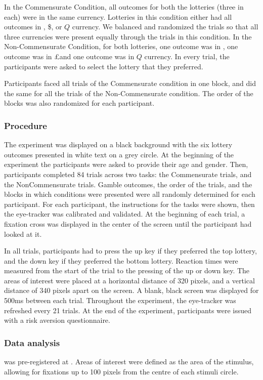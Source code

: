 \documentclass[doc, a4paper, apacite]{apa6}
\def\yenrule{\rule{1.3ex}{.1ex}}
\def\textyen{\renewcommand\stacktype{L}\stackon[.4ex]{\stackon[.65ex]{Y}{\yenrule}}{\yenrule}}
\begin{document}
In the Commensurate Condition, all outcomes for both the lotteries (three in each) were in the same currency. Lotteries in this condition either had all outcomes in \textyen, \$, or $Q$ currency. We balanced and randomized the trials so that all three currencies were present equally through the trials in this condition. In the Non-Commensurate Condition, for both lotteries, one outcome was in \textyen, one outcome was in \pounds\space and one outcome was in $Q$ currency. In every trial, the participants were asked to select the lottery that they preferred. 

Participants faced all trials of the Commensurate condition in one block, and did the same for all the trials of the Non-Commensurate condition. The order of the blocks was also randomized for each participant.

\subsubsection{Procedure}
The experiment was displayed on a black background with the six lottery outcomes presented in white text on a grey circle. At the beginning of the experiment the participants were asked to provide their age and gender. Then, participants completed 84 trials across two tasks: the Commensurate trials, and the NonCommensurate trials. Gamble outcomes, the order of the trials, and the blocks in which conditions were presented were all randomly determined for each participant. For each participant, the instructions for the tasks were shown, then the eye-tracker was calibrated and validated. At the beginning of each trial, a fixation cross was displayed in the center of the screen until the participant had looked at it. 

In all trials, participants had to press the up key if they preferred the top lottery, and the down key if they preferred the bottom lottery. Reaction times were measured from the start of the trial to the pressing of the up or down key. The areas of interest were placed at a horizontal distance of 320 pixels, and a vertical distance of 340 pixels apart on the screen. A blank, black screen was displayed for 500ms between each trial. Throughout the experiment, the eye-tracker was refreshed every 21 trials. At the end of the experiment, participants were issued with a risk aversion questionnaire.

\subsubsection{Data analysis}
 was pre-registered at \url{}.
Areas of interest were defined as the area of the stimulus, allowing for fixations up to 100 pixels from the centre of each stimuli circle. 
\end{document}
